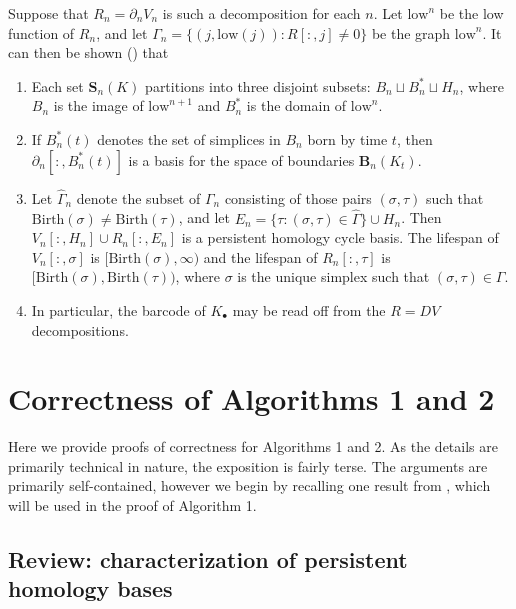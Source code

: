 \documentclass[11pt,onecolumn]{article}
\newcommand{\Boundaries}[0]{\mathbf{B}}
\newcommand{\Simplices}[0]{\mathbf{S}}
\newcommand{\birth}{\mathrm{Birth}}
\theoremstyle{plain}
\theoremstyle{definition}
\newcommand{\low}{\mathrm{low}}
\newcommand{\hatgraph}{{\hat{\Gamma}}}
\begin{document}
Suppose that $R_n = \partial_n V_n$ is such a decomposition for each $n$.   Let $\low^n$ be the low function of $R_n$, and let $\Gamma_n = \{(j, \low(j)) : R[:,j] \neq 0\}$ be the graph $\low^n$.  It can then be shown (\cite{cohen2006vines, SMVDualities11}) that
    \begin{enumerate}
        \item Each set $\Simplices_n(K)$ partitions into three disjoint subsets: $B_n \sqcup B^*_n \sqcup H_n$, where $B_n$ is the image of $\low^{n+1}$ and $B^*_n$ is the domain of $\low^n$.
        \item If $B_n^*(t)$ denotes the set of simplices in $B_n$ born by time $t$, then $\partial_n[:, B^*_n(t)]$ is a basis for the space of boundaries $\Boundaries_n(K_t)$.
        \item Let $\hatgraph_n$ denote the subset of $\Gamma_n$ consisting of those pairs $(\sigma, \tau)$ such that $\birth(\sigma) \neq \birth(\tau)$, and let $E_n = \{ \tau : (\sigma, \tau) \in \hatgraph \} \cup H_n$.  Then $V_n[:,H_n] \cup R_n[:,E_n] $ is a persistent homology cycle basis.  The lifespan of $V_n[:, \sigma]$ is $[\birth(\sigma), \infty)$ and the lifespan of $R_n[:, \tau]$ is $[\birth(\sigma), \birth(\tau))$, where $\sigma$ is the unique simplex such that $(\sigma, \tau) \in \Gamma$.  
        \item In particular, the barcode of $K_\bullet$ may be read off from the $R = DV$ decompositions.
    \end{enumerate}
    

\section{Correctness of Algorithms 1 and 2}

Here we provide proofs of correctness for Algorithms 1 and 2.  As the details are primarily technical in nature, the exposition is fairly terse.  The arguments are primarily self-contained, however we begin by recalling one result from \cite{eirene}, which will be used in the proof of Algorithm 1.

\subsection{Review: characterization of persistent homology bases}

\newcommand{\ei}{{\epsilon_i}}
\newcommand{\eineg}{{\epsilon_{i-1}}}
\newcommand{\ej}{{\epsilon_j}}
\newcommand{\ejneg}{{\epsilon_{j-1}}}
\newcommand{\xij}{X^{i, j}}
\newcommand{\yij}{Y^{i, j}}
\newcommand{\Qij}{Q^{i,j}}
\newcommand{\qij}{q^{i, j}}
\newcommand{\eij}{E^{i,j}}
\end{document}
